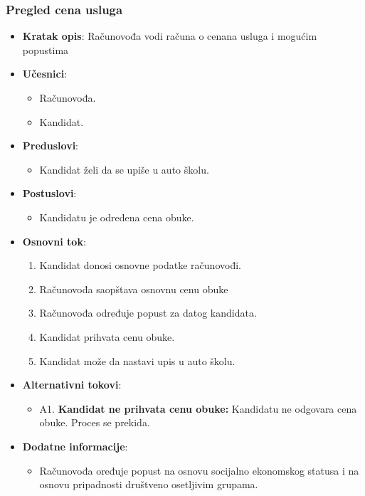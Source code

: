 \subsubsection{Pregled cena usluga}
\label{subsubsec:vozni park}
\begin{itemize}
  \item \textbf{Kratak opis}: Računovođa vodi računa o cenana usluga i mogućim popustima

  \item \textbf{Učesnici}:
    \begin{itemize}
    \item Računovođa.
    \item Kandidat.
    \end{itemize}
  \item \textbf{Preduslovi}:
    \begin{itemize}
    \item  Kandidat želi da se upiše u auto školu.
    \end{itemize}
  \item \textbf{Postuslovi}:
      \begin{itemize}
      \item  Kandidatu je određena cena obuke.
      \end{itemize}
  \item \textbf{Osnovni tok}:
      \begin{enumerate}
        \item Kandidat donosi osnovne podatke računovođi.
        \item Računovođa saopštava osnovnu cenu obuke
        \item Računovođa određuje popust za datog kandidata.
        \item Kandidat prihvata cenu obuke.
        \item Kandidat može da nastavi upis u auto školu.
      \end{enumerate}

  \item \textbf{Alternativni tokovi}:
      \begin{itemize}
        \item A1. \textbf{Kandidat ne prihvata cenu obuke:}
        Kandidatu ne odgovara cena obuke. Proces se prekida.
      \end{itemize}

      
  \item \textbf{Dodatne informacije}:
      \begin{itemize}
        \item Računovođa oređuje popust na osnovu socijalno ekonomskog statusa i na osnovu pripadnosti društveno osetljivim grupama.
      \end{itemize}
\end{itemize}

